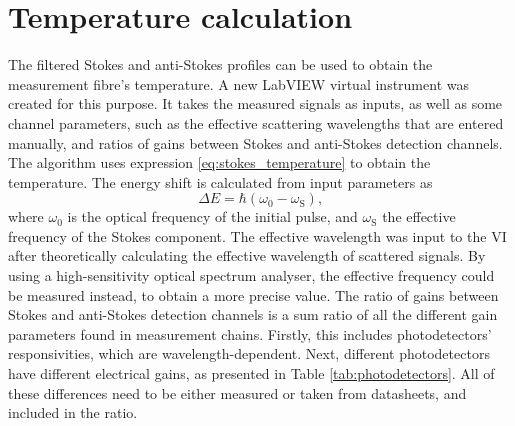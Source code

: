 \documentclass{standalone}
\begin{document}
\section{Temperature calculation}

The filtered Stokes and anti-Stokes profiles can be used to obtain the measurement fibre's temperature. A new LabVIEW virtual instrument was created for this purpose. It takes the measured signals as inputs, as well as some channel parameters, such as the effective scattering wavelengths that are entered manually, and ratios of gains between Stokes and anti-Stokes detection channels. The algorithm uses expression \ref{eq:stokes_temperature} to obtain the temperature. The energy shift is calculated from input parameters as
\begin{equation}
\varDelta E = \hbar (\omega_0 - \omega_\textrm{S}) \textrm{,}
\end{equation}
where $\omega_0$ is the optical frequency of the initial pulse, and $\omega_\textrm{S}$ the effective frequency of the Stokes component. The effective wavelength was input to the VI after theoretically calculating the effective wavelength of scattered signals. By using a high-sensitivity optical spectrum analyser, the effective frequency could be measured instead, to obtain a more precise value. The ratio of gains between Stokes and anti-Stokes detection channels is a sum ratio of all the different gain parameters found in measurement chains. Firstly, this includes photodetectors' responsivities, which are wavelength-dependent. Next, different photodetectors have different electrical gains, as presented in Table \ref{tab:photodetectors}. All of these differences need to be either measured or taken from datasheets, and included in the ratio. \\
\end{document}
